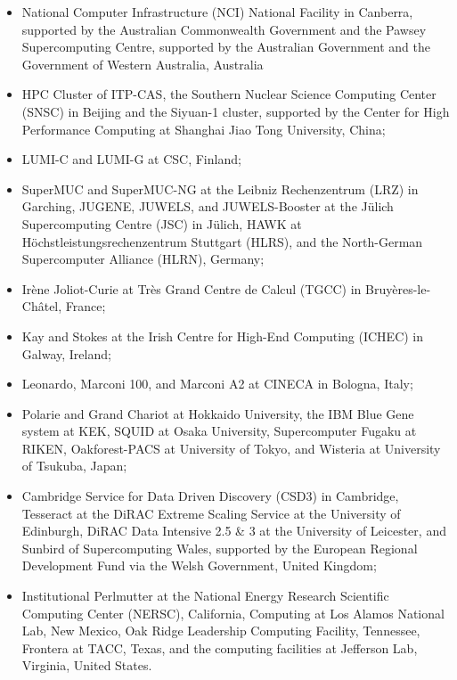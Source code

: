 \documentclass[a4paper,11pt]{article}
\begin{document}
\begin{itemize}[leftmargin=*, align=left, itemsep=1pt, topsep=0pt, parsep=0pt]
\item National Computer Infrastructure (NCI) National Facility in
  Canberra, supported by the Australian Commonwealth Government and
  the Pawsey Supercomputing Centre, supported by the Australian
  Government and the Government of Western Australia, Australia
  
\item HPC Cluster of ITP-CAS, the Southern Nuclear Science
  Computing Center (SNSC) in Beijing and the Siyuan-1 cluster,
  supported by the Center for High Performance Computing at Shanghai
  Jiao Tong University, China;
  
\item LUMI-C and LUMI-G at CSC, Finland;
  
\item SuperMUC and SuperMUC-NG at the Leibniz Rechenzentrum (LRZ) in
  Garching, JUGENE, JUWELS, and JUWELS-Booster at the Jülich
  Supercomputing Centre (JSC) in J\"ulich, HAWK at
  Höchstleistungsrechenzentrum Stuttgart (HLRS), and the
  North-German Supercomputer Alliance (HLRN), Germany;

\item  Irène Joliot-Curie at Très Grand Centre de Calcul (TGCC) in
  Bruyères-le-Châtel, France;

\item Kay and Stokes at the Irish Centre for High-End Computing
  (ICHEC) in Galway, Ireland;

\item Leonardo, Marconi 100, and Marconi A2 at CINECA in Bologna,
  Italy;
  
\item Polarie and Grand Chariot at Hokkaido University, the IBM Blue
  Gene system at KEK, SQUID at Osaka University, Supercomputer
  Fugaku at RIKEN, Oakforest-PACS at University of Tokyo, and
  Wisteria at University of Tsukuba, Japan;
  

\item Cambridge Service for Data Driven Discovery (CSD3) in Cambridge,
  Tesseract at the DiRAC Extreme Scaling Service at the University of
  Edinburgh, DiRAC Data Intensive 2.5 \& 3 at the University of
  Leicester, and Sunbird of Supercomputing Wales, supported by the
  European Regional Development Fund via the Welsh Government, United
  Kingdom;
    
\item Institutional Perlmutter at the National Energy Research
Scientific Computing Center (NERSC), California, Computing at Los
Alamos National Lab, New Mexico, Oak Ridge Leadership Computing
Facility, Tennessee, Frontera at TACC, Texas, and the computing
facilities at Jefferson Lab, Virginia, United States.
\end{itemize}


 
\end{document}
